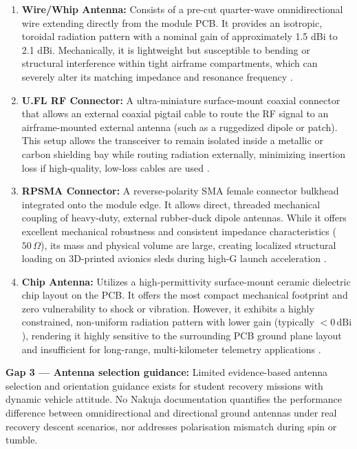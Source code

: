 \begin{enumerate}
    \item \textbf{Wire/Whip Antenna:} Consists of a pre-cut quarter-wave omnidirectional wire extending directly from the module PCB. It provides an isotropic, toroidal radiation pattern with a nominal gain of approximately 1.5 dBi to 2.1 dBi. Mechanically, it is lightweight but susceptible to bending or structural interference within tight airframe compartments, which can severely alter its matching impedance and resonance frequency \cite{xbee_manual}.
    
    \item \textbf{U.FL RF Connector:} A ultra-miniature surface-mount coaxial connector that allows an external coaxial pigtail cable to route the RF signal to an airframe-mounted external antenna (such as a ruggedized dipole or patch). This setup allows the transceiver to remain isolated inside a metallic or carbon shielding bay while routing radiation externally, minimizing insertion loss if high-quality, low-loss cables are used \cite{pozar_microwave}.
    
    \item \textbf{RPSMA Connector:} A reverse-polarity SMA female connector bulkhead integrated onto the module edge. It allows direct, threaded mechanical coupling of heavy-duty, external rubber-duck dipole antennas. While it offers excellent mechanical robustness and consistent impedance characteristics ($50\,\Omega$), its mass and physical volume are large, creating localized structural loading on 3D-printed avionics sleds during high-G launch acceleration \cite{high_g_electronics, xbee_manual}.
    
    \item \textbf{Chip Antenna:} Utilizes a high-permittivity surface-mount ceramic dielectric chip layout on the PCB. It offers the most compact mechanical footprint and zero vulnerability to shock or vibration. However, it exhibits a highly constrained, non-uniform radiation pattern with lower gain (typically $< 0\,\mathrm{dBi}$), rendering it highly sensitive to the surrounding PCB ground plane layout and insufficient for long-range, multi-kilometer telemetry applications \cite{pozar_microwave, xbee_manual}.
\end{enumerate}

\textbf{Gap 3 --- Antenna selection guidance:} Limited evidence-based antenna selection and orientation guidance exists for student recovery missions with dynamic vehicle attitude. No Nakuja documentation quantifies the performance difference between omnidirectional and directional ground antennas under real recovery descent scenarios, nor addresses polarisation mismatch during spin or tumble.


